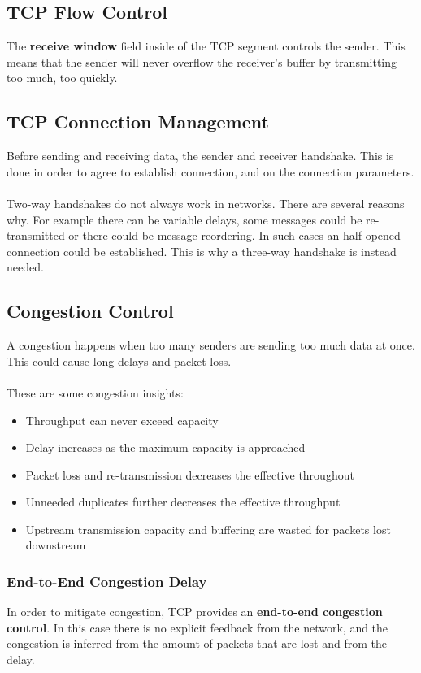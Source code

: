 \documentclass{article}
\begin{document}
\subsection{TCP Flow Control}
The \textbf{receive window} field inside of the TCP segment controls the sender. This means that the sender will never overflow the receiver's buffer by transmitting too much, too quickly.

\subsection{TCP Connection Management}
Before sending and receiving data, the sender and receiver handshake. This is done in order to agree to establish connection, and on the connection parameters. \\ \\
Two-way handshakes do not always work in networks. There are several reasons why. For example there can be variable delays, some messages could be re-transmitted or there could be message reordering. In such cases an half-opened connection could be established. This is why a three-way handshake is instead needed.

\subsection{Congestion Control}
A congestion happens when too many senders are sending too much data at once. This could cause long delays and packet loss. \\ \\
These are some congestion insights:

\begin{itemize}
	\item Throughput can never exceed capacity
	\item Delay increases as the maximum capacity is approached
	\item Packet loss and re-transmission decreases the effective throughout
	\item Unneeded duplicates further decreases the effective throughput
	\item Upstream transmission capacity and buffering are wasted for packets lost downstream
\end{itemize}

\subsubsection{End-to-End Congestion Delay}
In order to mitigate congestion, TCP provides an \textbf{end-to-end congestion control}. In this case there is no explicit feedback from the network, and the congestion is inferred from the amount of packets that are lost and from the delay.
\end{document}
